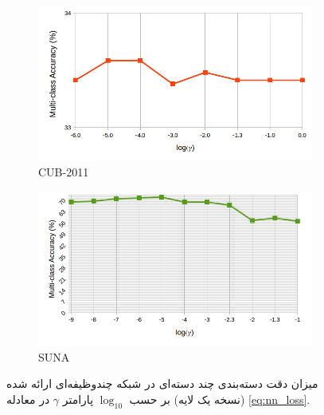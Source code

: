 \begin{figure}[!th]
\begin{subfigure}[b]{0.43\linewidth}
    \includegraphics[width=\linewidth]{images/nn_param_birds}
    \caption{CUB-2011}
\end{subfigure}
\begin{subfigure}[b]{0.43\linewidth}
    \includegraphics[width=\linewidth]{images/nn_param_sun}
    \caption{SUNA}
\end{subfigure}
\caption[نمودار تحلیل پارامتر شبکه عصبی]{
میزان دقت دسته‌بندی چند دسته‌ای در شبکه چندوظیفه‌ای ارائه شده (نسخه یک لایه) بر حسب $\log_{10}$ پارامتر $\gamma$ در معادله
\eqref{eq:nn_loss}.
}
\label{fig:nn_param}
\end{figure}




